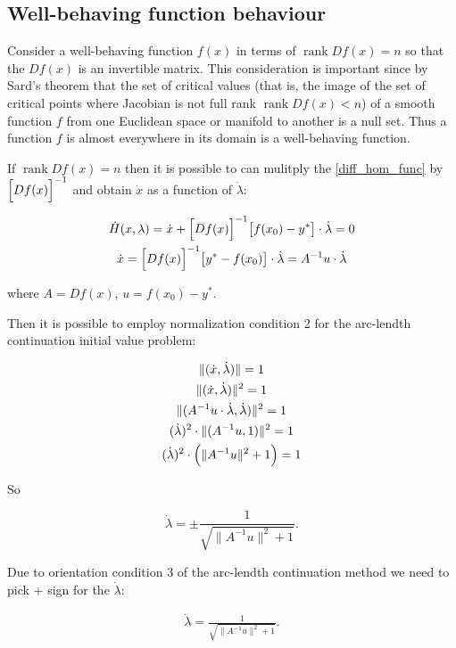\documentclass[11pt,american]{article}
\DeclareMathOperator{\rank}{\operatorname{rank}}
\begin{document}
\subsection{Well-behaving function behaviour}

Consider a well-behaving function $f(x)$ in terms of $\rank D f(x) = n$ so that the $D f(x)$ is an invertible matrix. This consideration is important since by Sard's theorem that the set of critical values (that is, the image of the set of critical points where Jacobian is not full rank $\rank D f(x) < n$) of a smooth function $f$ from one Euclidean space or manifold to another is a null set. Thus a function $f$ is almost everywhere in its domain is a well-behaving function.

If $\rank D f(x) = n$ then it is possible to can mulitply the \eqref{diff_hom_func} by $\Bigl[ D f(x) \Bigr]^{-1}$ and obtain $\dot x$ as a function of $\dot \lambda$:

\begin{gather}
\dot H(x,\lambda) = \dot x + \Bigl[ D f(x) \Bigr]^{-1} \bigl[ f(x_0) - y^* \bigr] \cdot \dot \lambda = 0\\
\dot x = \Bigl[ D f(x) \Bigr]^{-1} \bigl[ y^* - f(x_0) \bigr] \cdot \dot \lambda = A^{-1} u \cdot \dot \lambda
\end{gather}

where $A = D f(x)$, $u = f(x_0) - y^*$.

Then it is possible to employ normalization condition 2 for the arc-lendth continuation initial value problem: 

\begin{gather}
\|(\dot x,\dot \lambda)\| = 1 \\
\|(\dot x,\dot \lambda)\|^2 = 1 \\
\| ( A^{-1} u \cdot \dot \lambda , \dot \lambda ) \|^2 = 1 \\
(\dot \lambda)^2 \cdot \| (A^{-1} u , 1) \|^2 = 1 \\
(\dot \lambda)^2 \cdot \Bigl( \| A^{-1} u \|^2 + 1 \Bigr ) = 1
\end{gather}

So

\begin{equation}
\dot \lambda = \pm \frac{1}{\sqrt{\|A^{-1}u\|^2 + 1}}.
\end{equation}

Due to orientation condition 3 of the arc-lendth continuation method we need to pick $+$ sign for the $\dot \lambda$:

\begin{gather}
\dot \lambda = \frac{1}{\sqrt{\|A^{-1}u\|^2 + 1}}.
\end{gather}
\end{document}
